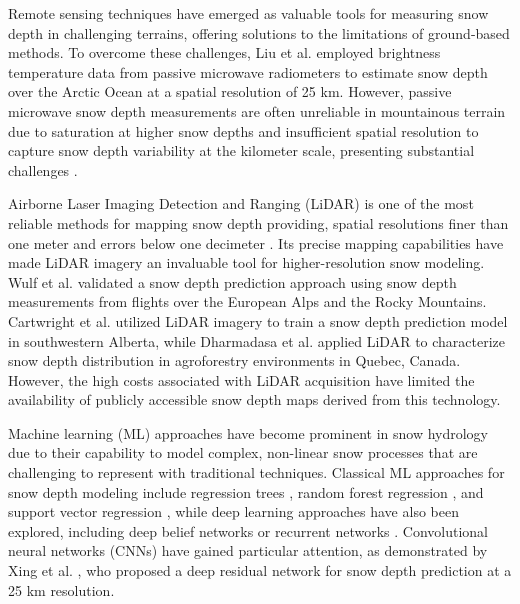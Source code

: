 \documentclass[preprint,12pt]{elsarticle}
\begin{document}
Remote sensing techniques have emerged as valuable tools for measuring snow depth in challenging terrains, offering solutions to the limitations of ground-based methods. To overcome these challenges, Liu et al. \cite{liu2019retrieval} employed brightness temperature data from passive microwave radiometers to estimate snow depth over the Arctic Ocean at a spatial resolution of 25 km. However, passive microwave snow depth measurements are often unreliable in mountainous terrain due to saturation at higher snow depths and insufficient spatial resolution to capture snow depth variability at the kilometer scale, presenting substantial challenges \cite{Tedesco2010, Tong2010, Smith2018}. %

Airborne Laser Imaging Detection and Ranging (LiDAR) is one of the most reliable methods for mapping snow depth providing, spatial resolutions finer than one meter and errors below one decimeter \cite{revuelto2021intercomparison, deems2013lidar, buhler2016mapping}. Its precise mapping capabilities have made LiDAR imagery an invaluable tool for higher-resolution snow modeling. Wulf et al. \cite{wulf2020high} validated a snow depth prediction approach using snow depth measurements from flights over the European Alps and the Rocky Mountains. Cartwright et al. \cite{cartwright2022machine} utilized LiDAR imagery to train a snow depth prediction model in southwestern Alberta, while Dharmadasa et al. \cite{Dharmadasa2023, Dharmadasa2024} applied LiDAR to characterize snow depth distribution in agroforestry environments in Quebec, Canada. However, the high costs associated with LiDAR acquisition have limited the availability of publicly accessible snow depth maps derived from this technology. 

Machine learning (ML) approaches have become prominent in snow hydrology due to their capability to model complex, non-linear snow processes that are challenging to represent with traditional techniques. Classical ML approaches for snow depth modeling include regression trees \cite{winstral2002spatial}, random forest regression \cite{hu2021snow}, and support vector regression \cite{hu2021snow}, while deep learning approaches have also been explored, including deep belief networks \cite{wang2020estimating} or recurrent networks \cite{meyal2020automated}. Convolutional neural networks (CNNs) have gained particular attention, as demonstrated by Xing et al. \cite{xing2022estimation}, who proposed a deep residual network for snow depth prediction at a 25 km resolution.
\end{document}
